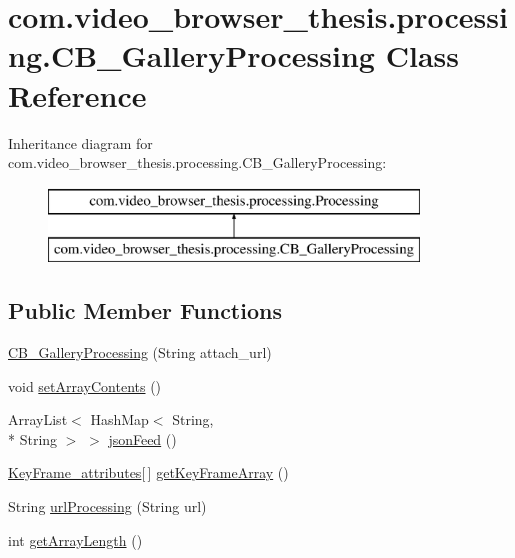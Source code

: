 \hypertarget{classcom_1_1video__browser__thesis_1_1processing_1_1_c_b___gallery_processing}{\section{com.\-video\-\_\-browser\-\_\-thesis.\-processing.\-C\-B\-\_\-\-Gallery\-Processing Class Reference}
\label{classcom_1_1video__browser__thesis_1_1processing_1_1_c_b___gallery_processing}
}
Inheritance diagram for com.\-video\-\_\-browser\-\_\-thesis.\-processing.\-C\-B\-\_\-\-Gallery\-Processing\-:\begin{figure}[H]
\begin{center}
\leavevmode
\includegraphics[height=2.000000cm]{classcom_1_1video__browser__thesis_1_1processing_1_1_c_b___gallery_processing}
\end{center}
\end{figure}
\subsection*{Public Member Functions}
\begin{DoxyCompactItemize}
\item 
\hyperlink{classcom_1_1video__browser__thesis_1_1processing_1_1_c_b___gallery_processing_a0eeca49d3cc3386cc0f824efa5312032}{C\-B\-\_\-\-Gallery\-Processing} (String attach\-\_\-url)
\item 
void \hyperlink{classcom_1_1video__browser__thesis_1_1processing_1_1_c_b___gallery_processing_a16c377eca1a10f291e20dd12d49e09fc}{set\-Array\-Contents} ()
\item 
Array\-List$<$ Hash\-Map$<$ String, \\*
String $>$ $>$ \hyperlink{classcom_1_1video__browser__thesis_1_1processing_1_1_c_b___gallery_processing_a11c1cd0ec7e6dec9f4ed4ea493c6c119}{json\-Feed} ()
\item 
\hyperlink{classcom_1_1video__browser__thesis_1_1elements_1_1_key_frame__attributes}{Key\-Frame\-\_\-attributes}\mbox{[}$\,$\mbox{]} \hyperlink{classcom_1_1video__browser__thesis_1_1processing_1_1_c_b___gallery_processing_a5cff6c76f807593369cf0bdeb90f9d70}{get\-Key\-Frame\-Array} ()
\item 
String \hyperlink{classcom_1_1video__browser__thesis_1_1processing_1_1_c_b___gallery_processing_ae3b50ed68ffbb15f03e6fdaf5536c79d}{url\-Processing} (String url)
\item 
int \hyperlink{classcom_1_1video__browser__thesis_1_1processing_1_1_c_b___gallery_processing_a1b95cc0eac8b9dfe0870fe57d60862c5}{get\-Array\-Length} ()
\end{DoxyCompactItemize}


